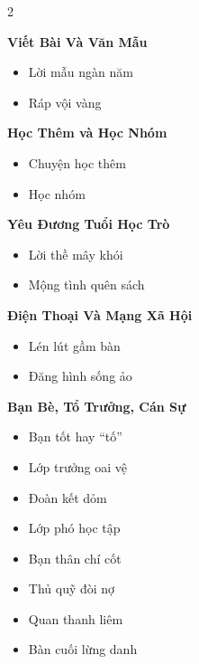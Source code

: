\begin{multicols}{2}
\begin{itemize}[leftmargin=1.2em, itemsep=0.1em, label=\textcolor{titlecolor}{\tiny$\blacksquare$}]
\end{itemize}
\vspace{0.8em}
\textbf{\color{chapterline}Viết Bài Và Văn Mẫu}
\begin{itemize}[leftmargin=1.2em, itemsep=0.1em, label=\textcolor{titlecolor}{\tiny$\blacksquare$}]
  \item Lời mẫu ngàn năm
  \item Ráp vội vàng
\end{itemize}
\vspace{0.8em}
\textbf{\color{chapterline}Học Thêm và Học Nhóm}
\begin{itemize}[leftmargin=1.2em, itemsep=0.1em, label=\textcolor{titlecolor}{\tiny$\blacksquare$}]
  \item Chuyện học thêm
  \item Học nhóm
\end{itemize}
\vspace{0.8em}
\textbf{\color{chapterline}Yêu Đương Tuổi Học Trò}
\begin{itemize}[leftmargin=1.2em, itemsep=0.1em, label=\textcolor{titlecolor}{\tiny$\blacksquare$}]
  \item Lời thề mây khói
  \item Mộng tình quên sách
\end{itemize}
\vspace{0.8em}
\textbf{\color{chapterline}Điện Thoại Và Mạng Xã Hội}
\begin{itemize}[leftmargin=1.2em, itemsep=0.1em, label=\textcolor{titlecolor}{\tiny$\blacksquare$}]
  \item Lén lút gầm bàn
  \item Đăng hình sống ảo
\end{itemize}
\vspace{0.8em}
\textbf{\color{chapterline}Bạn Bè, Tổ Trưởng, Cán Sự}
\begin{itemize}[leftmargin=1.2em, itemsep=0.1em, label=\textcolor{titlecolor}{\tiny$\blacksquare$}]
  \item Bạn tốt hay ``tố''
  \item Lớp trưởng oai vệ
  \item Đoàn kết dỏm
  \item Lớp phó học tập
  \item Bạn thân chí cốt
  \item Thủ quỹ đòi nợ
  \item Quan thanh liêm
  \item Bàn cuối lừng danh
\end{itemize}
\vspace{0.8em}

\end{multicols}
